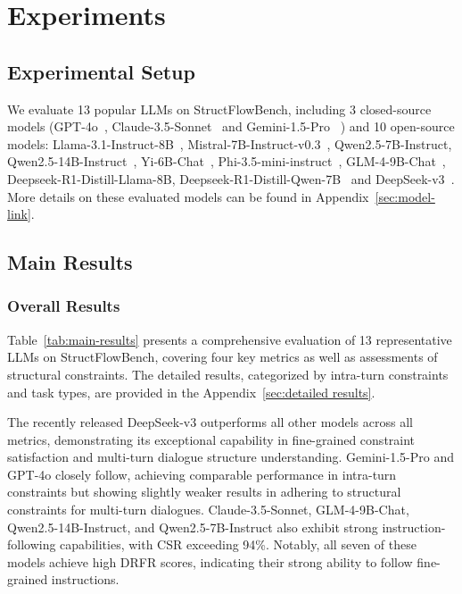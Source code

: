 \section{Experiments}

\subsection{Experimental Setup}
We evaluate 13 popular LLMs on StructFlowBench, including 3 closed-source models (GPT-4o~\cite{hurst2024gpt}, Claude-3.5-Sonnet~\cite{anthropic2024claude} and Gemini-1.5-Pro~\cite{team2024gemini} ) and 10 open-source models: Llama-3.1-Instruct-8B~\cite{dubey2024llama}, Mistral-7B-Instruct-v0.3~\cite{jiang2023mistral}, Qwen2.5-7B-Instruct, Qwen2.5-14B-Instruct~\cite{yang2024qwen2}, Yi-6B-Chat~\cite{young2024yi}, Phi-3.5-mini-instruct~\cite{abdin2024phi}, GLM-4-9B-Chat~\cite{glm2024chatglm}, Deepseek-R1-Distill-Llama-8B, Deepseek-R1-Distill-Qwen-7B~\cite{guo2025deepseek} and DeepSeek-v3~\cite{liu2024deepseek}.
More details on these evaluated models can be found in Appendix~\ref{sec:model-link}.

\subsection{Main Results}
\subsubsection*{Overall Results}

Table~\ref{tab:main-results} presents a comprehensive evaluation of 13 representative LLMs on StructFlowBench, covering four key metrics as well as assessments of structural constraints. 
The detailed results, categorized by intra-turn constraints and task types, are provided in the Appendix~\ref{sec:detailed results}.

The recently released DeepSeek-v3 outperforms all other models across all metrics, demonstrating its exceptional capability in fine-grained constraint satisfaction and multi-turn dialogue structure understanding. 
Gemini-1.5-Pro and GPT-4o closely follow, achieving comparable performance in intra-turn constraints but showing slightly weaker results in adhering to structural constraints for multi-turn dialogues. 
Claude-3.5-Sonnet, GLM-4-9B-Chat, Qwen2.5-14B-Instruct, and Qwen2.5-7B-Instruct also exhibit strong instruction-following capabilities, with CSR exceeding 94\%. 
Notably, all seven of these models achieve high DRFR scores, indicating their strong ability to follow fine-grained instructions.

